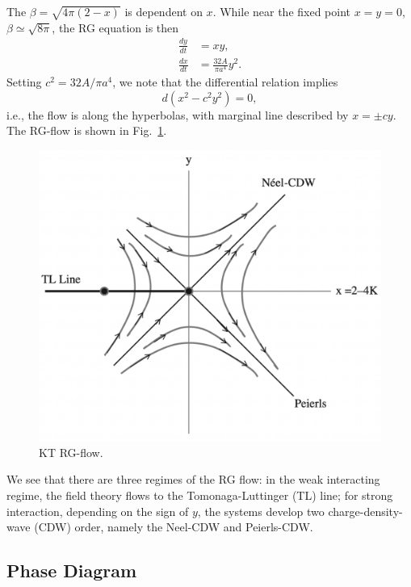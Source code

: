 The $\beta = \sqrt{4\pi(2-x)}$ is dependent on $x$.
While near the fixed point $x=y=0$, $\beta \simeq \sqrt{8\pi}$, the RG equation is then
\begin{equation}
\begin{aligned}
	\frac{dy}{dt} &= xy, \\
	\frac{dx}{dt} &= \frac{32 A}{\pi a^4} y^2.
\end{aligned}
\end{equation}
Setting $c^2 = 32A/\pi a^4$, we note that the differential relation implies
\begin{equation}
	d(x^2- c^2 y^2) = 0,
\end{equation}
i.e., the flow is along the hyperbolas, with marginal line described by $x = \pm cy$.
The RG-flow is shown in Fig.~\ref{fig:FL-RG-flow}.

\begin{figure}
	\centering
	\includegraphics[width=0.5\linewidth]{pics/FL-RG-flow}
	\caption{KT RG-flow.}
	\label{fig:FL-RG-flow}
\end{figure}

We see that there are three regimes of the RG flow: in the weak interacting regime, the field theory flows to the Tomonaga-Luttinger (TL) line; for strong interaction, depending on the sign of $y$, the systems develop two charge-density-wave (CDW) order, namely the Neel-CDW and Peierls-CDW.


\subsection{Phase Diagram}

